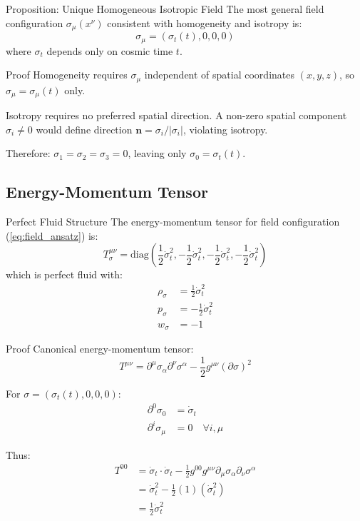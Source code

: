 \documentclass[11pt,a4paper]{article}
\theoremstyle{definition}
\theoremstyle{remark}
\begin{document}
	Proposition: Unique Homogeneous Isotropic Field
		The most general field configuration $\sigma_\mu(x^\nu)$ consistent with homogeneity and isotropy is:
		\begin{equation}\label{eq:field_ansatz}
			\sigma_\mu = (\sigma_t(t), 0, 0, 0)
		\end{equation}
		where $\sigma_t$ depends only on cosmic time $t$.
	
	Proof
		Homogeneity requires $\sigma_\mu$ independent of spatial coordinates $(x, y, z)$, so $\sigma_\mu = \sigma_\mu(t)$ only.
		
		Isotropy requires no preferred spatial direction. A non-zero spatial component $\sigma_i \neq 0$ would define direction $\mathbf{n} = \sigma_i/|\sigma_i|$, violating isotropy.
		
		Therefore: $\sigma_1 = \sigma_2 = \sigma_3 = 0$, leaving only $\sigma_0 = \sigma_t(t)$.
	
	\subsection{Energy-Momentum Tensor}
	
	Perfect Fluid Structure
		The energy-momentum tensor for field configuration (\ref{eq:field_ansatz}) is:
		\begin{equation}
			T^{\mu\nu}_\sigma = \text{diag}\left(\frac{1}{2}\dot{\sigma}_t^2, -\frac{1}{2}\dot{\sigma}_t^2, -\frac{1}{2}\dot{\sigma}_t^2, -\frac{1}{2}\dot{\sigma}_t^2\right)
		\end{equation}
		which is perfect fluid with:
		\begin{align}
			\rho_\sigma &= \frac{1}{2}\dot{\sigma}_t^2\\
			p_\sigma &= -\frac{1}{2}\dot{\sigma}_t^2\\
			w_\sigma &= -1
		\end{align}
	
	Proof
		Canonical energy-momentum tensor:
		\begin{equation}
			T^{\mu\nu} = \partial^\mu\sigma_\alpha\partial^\nu\sigma^\alpha - \frac{1}{2}g^{\mu\nu}(\partial\sigma)^2
		\end{equation}
		
		For $\sigma = (\sigma_t(t), 0, 0, 0)$:
		\begin{align}
			\partial^0\sigma_0 &= \dot{\sigma}_t\\
			\partial^i\sigma_\mu &= 0 \quad \forall i, \mu
		\end{align}
		
		Thus:
		\begin{align}
			T^{00} &= \dot{\sigma}_t \cdot \dot{\sigma}_t - \frac{1}{2}g^{00}g^{\mu\nu}\partial_\mu\sigma_\alpha\partial_\nu\sigma^\alpha\\
			&= \dot{\sigma}_t^2 - \frac{1}{2}(1)(\dot{\sigma}_t^2)\\
			&= \frac{1}{2}\dot{\sigma}_t^2
		\end{align}
		
\end{document}
